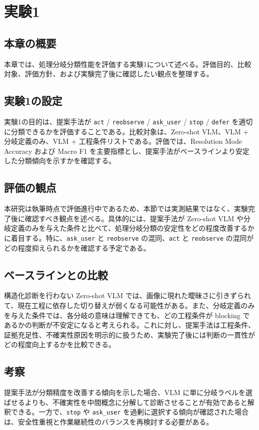 \chapter{実験1}

\section{本章の概要}

本章では、処理分岐分類性能を評価する実験1について述べる。評価目的、比較対象、評価方針、および実験完了後に確認したい観点を整理する。

\section{実験1の設定}

実験1の目的は、提案手法が \texttt{act} / \texttt{reobserve} / \texttt{ask\_user} / \texttt{stop} / \texttt{defer} を適切に分類できるかを評価することである。比較対象は、Zero-shot VLM、VLM + 分岐定義のみ、VLM + 工程条件リストである。評価では、Resolution Mode Accuracy および Macro F1 を主要指標とし、提案手法がベースラインより安定した分類傾向を示すかを確認する。

\section{評価の観点}

本研究は執筆時点で評価進行中であるため、本節では実測結果ではなく、実験完了後に確認すべき観点を述べる。具体的には、提案手法が Zero-shot VLM や分岐定義のみを与えた条件と比べて、処理分岐分類の安定性をどの程度改善するかに着目する。特に、\texttt{ask\_user} と \texttt{reobserve} の混同、\texttt{act} と \texttt{reobserve} の混同がどの程度抑えられるかを確認する予定である。

\section{ベースラインとの比較}

構造化診断を行わない Zero-shot VLM では、画像に現れた曖昧さに引きずられて、現在工程に依存した切り替えが弱くなる可能性がある。また、分岐定義のみを与えた条件では、各分岐の意味は理解できても、どの工程条件が blocking であるかの判断が不安定になると考えられる。これに対し、提案手法は工程条件、証拠充足性、不確実性原因を明示的に扱うため、実験完了後には判断の一貫性がどの程度向上するかを比較できる。

\section{考察}

提案手法が分類精度を改善する傾向を示した場合、VLM に単に分岐ラベルを選ばせるよりも、不確実性を中間概念に分解して診断させることが有効であると解釈できる。一方で、\texttt{stop} や \texttt{ask\_user} を過剰に選択する傾向が確認された場合は、安全性重視と作業継続性のバランスを再検討する必要がある。
